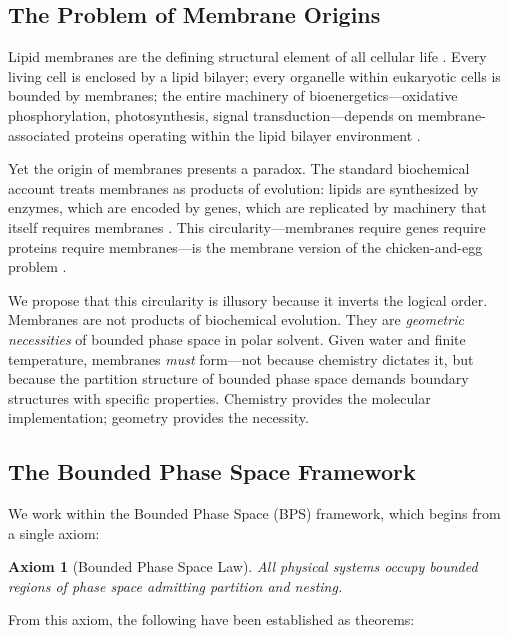 \documentclass[twocolumn,10pt]{article}
\newtheorem{axiom}{Axiom}
\theoremstyle{remark}
\begin{document}
\subsection{The Problem of Membrane Origins}

Lipid membranes are the defining structural element of all cellular life \cite{alberts2015}. Every living cell is enclosed by a lipid bilayer; every organelle within eukaryotic cells is bounded by membranes; the entire machinery of bioenergetics---oxidative phosphorylation, photosynthesis, signal transduction---depends on membrane-associated proteins operating within the lipid bilayer environment \cite{nicholls2013,gennis1989}.

Yet the origin of membranes presents a paradox. The standard biochemical account treats membranes as products of evolution: lipids are synthesized by enzymes, which are encoded by genes, which are replicated by machinery that itself requires membranes \cite{szostak2001}. This circularity---membranes require genes require proteins require membranes---is the membrane version of the chicken-and-egg problem \cite{deamer2017}.

We propose that this circularity is illusory because it inverts the logical order. Membranes are not products of biochemical evolution. They are \emph{geometric necessities} of bounded phase space in polar solvent. Given water and finite temperature, membranes \emph{must} form---not because chemistry dictates it, but because the partition structure of bounded phase space demands boundary structures with specific properties. Chemistry provides the molecular implementation; geometry provides the necessity.

\subsection{The Bounded Phase Space Framework}

We work within the Bounded Phase Space (BPS) framework, which begins from a single axiom:

\begin{axiom}[Bounded Phase Space Law]
\label{axiom:bps}
All physical systems occupy bounded regions of phase space admitting partition and nesting.
\end{axiom}

From this axiom, the following have been established as theorems:
\end{document}
